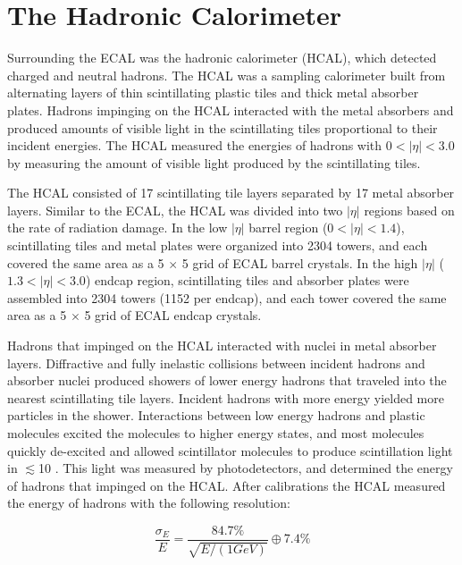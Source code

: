 \section{The Hadronic Calorimeter}
\label{sec:hcalDescription}
Surrounding the ECAL was the hadronic calorimeter (HCAL), which detected charged and neutral hadrons.  The 
HCAL was a sampling calorimeter built from alternating layers of thin scintillating plastic tiles and thick 
metal absorber plates.  Hadrons impinging on the HCAL interacted with the metal absorbers and produced amounts 
of visible light in the scintillating tiles proportional to their incident energies.  The HCAL 
measured the energies of hadrons with $0 < |\eta| < 3.0$ by measuring the amount of visible light produced 
by the scintillating tiles.

The HCAL consisted of 17 scintillating tile layers separated by 17 metal absorber layers.  Similar to the ECAL, the 
HCAL was divided into two $|\eta|$ regions based on the rate of radiation damage.  In the low $|\eta|$ barrel 
region ($0 < |\eta| < 1.4$), scintillating tiles and metal plates were organized into 2304 towers, and each 
covered the same area as a 5 $\times$ 5 grid of 
ECAL barrel crystals.  In the high $|\eta|$ ($1.3 < |\eta| < 3.0$) endcap region, scintillating 
tiles and absorber plates were assembled into 2304 towers (1152 per endcap), and each tower covered the same area 
as a 5 $\times$ 5 grid of ECAL endcap crystals.

Hadrons that impinged on the HCAL interacted with nuclei in metal absorber layers.  Diffractive and fully 
inelastic collisions between incident hadrons and absorber nuclei produced showers of lower 
energy hadrons that traveled into the nearest scintillating tile layers.  Incident hadrons with more energy yielded 
more particles in the shower.  Interactions between low energy hadrons and plastic molecules excited the molecules to 
higher energy states, and most molecules quickly de-excited and allowed scintillator molecules to produce scintillation 
light in $\lesssim$10 \ns.  This light was measured by photodetectors, and determined the energy of hadrons 
that impinged on the HCAL.  After calibrations the HCAL measured the energy of hadrons with the following resolution:

\begin{equation}
	\frac{\sigma_{E}}{E} = \frac{84.7\%}{\sqrt{E/(1 GeV)}} \oplus 7.4\%
\end{equation}

